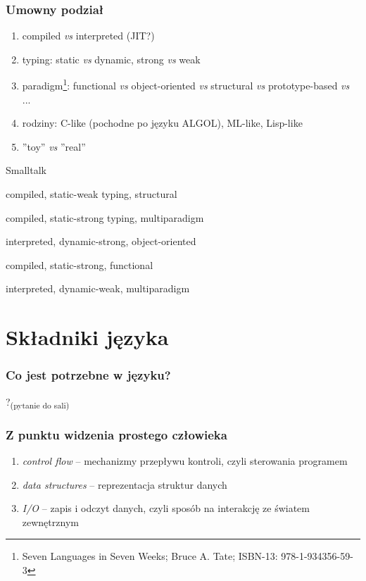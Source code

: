 \documentclass[aspectratio=169]{beamer}
\begin{document}
\begin{frame}
    \frametitle{Umowny podział}

    \begin{enumerate}
        \item compiled \emph{vs} interpreted (JIT?)
        \item typing: static \emph{vs} dynamic, strong \emph{vs} weak
        \item paradigm\footnote{Seven Languages in Seven Weeks; Bruce A. Tate;
            ISBN-13: 978-1-934356-59-3}: functional \emph{vs} object-oriented
            \emph{vs} structural \emph{vs} prototype-based \emph{vs} ...
        \item rodziny: C-like (pochodne po języku ALGOL), ML-like, Lisp-like
        \item ''toy'' \emph{vs} ''real''
    \end{enumerate}

    \vspace{1em}

    \begin{labeling}{Smalltalk}
        \item[C] compiled, static-weak typing, structural
        \item[C++] compiled, static-strong typing, multiparadigm
        \item[Smalltalk] interpreted, dynamic-strong, object-oriented
        \item[OCaml] compiled, static-strong, functional
        \item[Perl] interpreted, dynamic-weak, multiparadigm
    \end{labeling}
\end{frame}

\section{Składniki języka}

\begin{frame}
    \frametitle{Co jest potrzebne w języku?}

    ?{\tiny \textsubscript{(pytanie do sali)}}
\end{frame}

\begin{frame}
    \frametitle{Z punktu widzenia prostego człowieka}

    \begin{enumerate}
        \item \emph{control flow} -- mechanizmy przepływu kontroli, czyli
            sterowania programem
        \item \emph{data structures} -- reprezentacja struktur danych
        \item \emph{I/O} -- zapis i odczyt danych, czyli sposób na interakcję ze
            światem zewnętrznym
    \end{enumerate}
\end{frame}
\end{document}
